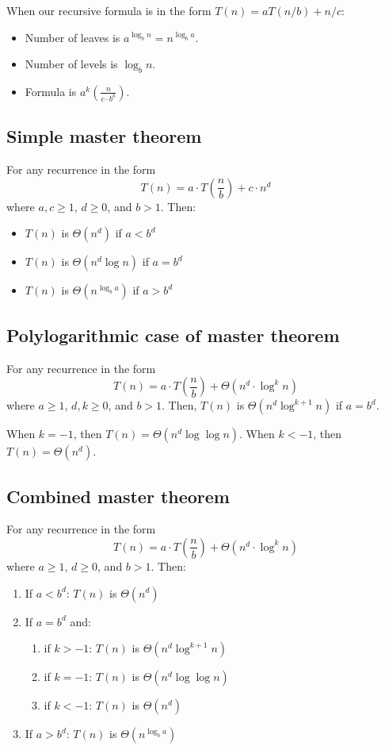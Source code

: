 \documentclass{article}
\begin{document}
When our recursive formula is in the form $T(n) = aT(n/b) + n/c$:
\begin{itemize}
    \item Number of leaves is $a^{\log_b n} = n^{\log_b a}$.
    \item Number of levels is $\log_b n$.
    \item Formula is $a^k\left(\frac{n}{c \cdot b^k}\right)$.
\end{itemize}

\subsection{Simple master theorem}
For any recurrence in the form $$T(n) = a \cdot T\left(\frac{n}{b}\right) + c \cdot n^d$$ where $a, c \geq 1$, $d \geq 0$, and $b > 1$. Then:

\begin{itemize}
    \item $T(n)$ is $\Theta(n^d)$ if $a < b^d$
    \item $T(n)$ is $\Theta(n^d \log n)$ if $a = b^d$
    \item $T(n)$ is $\Theta(n^{\log_b a})$ if $a > b^d$
\end{itemize}

\subsection{Polylogarithmic case of master theorem}
For any recurrence in the form $$T(n) = a \cdot T\left(\frac{n}{b}\right) + \Theta(n^d \cdot \log^k n)$$ where $a \geq 1$, $d, k \geq 0$, and $b > 1$. Then, $T(n)$ is $\Theta(n^d \log^{k + 1} n)$ if $a = b^d$.

When $k = -1$, then $T(n) = \Theta(n^d \log \log n)$. When $k < -1$, then $T(n) = \Theta(n^d)$.

\subsection{Combined master theorem}
For any recurrence in the form $$T(n) = a \cdot T\left(\frac{n}{b}\right) + \Theta(n^d \cdot \log^k n)$$ where $a \geq 1$, $d \geq 0$, and $b > 1$. Then:

\begin{enumerate}
    \item If $a < b^d$: $T(n)$ is $\Theta(n^d)$
    \item If $a = b^d$ and:
    \begin{enumerate}
        \item if $k > -1$: $T(n)$ is $\Theta(n^d \log^{k + 1} n)$
        \item if $k = -1$: $T(n)$ is $\Theta(n^d \log \log n)$
        \item if $k < -1$: $T(n)$ is $\Theta(n^d)$
    \end{enumerate}
    \item If $a > b^d$: $T(n)$ is $\Theta(n^{\log_b a})$
\end{enumerate}
\end{document}
